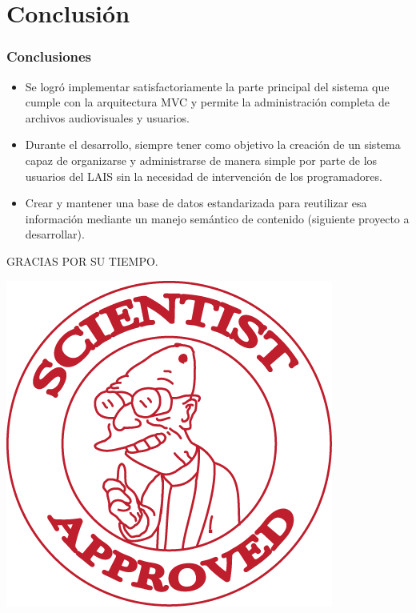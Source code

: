 \documentclass{beamer}
\begin{document}
\section{Conclusión}
\begin{frame}
	\frametitle{Conclusiones}
	\begin{itemize}
		\item Se logró implementar satisfactoriamente la parte principal del sistema que cumple con la arquitectura MVC y permite la administración completa de archivos audiovisuales y usuarios.
		\item Durante el desarrollo, siempre tener como objetivo la creación de un sistema capaz de organizarse y administrarse de manera simple por parte de los usuarios del LAIS sin la necesidad de intervención de los programadores.
		\item Crear y mantener una base de datos estandarizada para reutilizar esa información mediante un manejo semántico de contenido (siguiente proyecto a desarrollar).
	\end{itemize}
\end{frame}

\begin{frame}
	\begin{center}
		GRACIAS POR SU TIEMPO.
		
		\includegraphics{scientistapprovedfutura.png}
	\end{center}
\end{frame}
\end{document}
